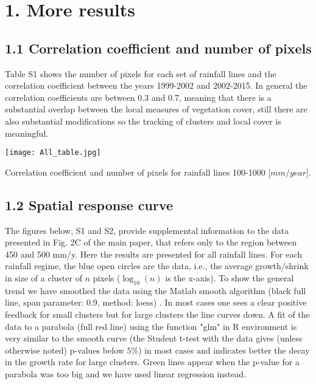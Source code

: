 \documentclass[aps,pre,twocolumn]{revtex4-1}
\begin{document}
\section*{1. More results}
\subsection*{1.1 Correlation coefficient and number of pixels} Table S1 shows the number of pixels for each set of rainfall lines and the correlation coefficient between the years 1999-2002 and 2002-2015. In general the correlation coefficients are between 0.3 and 0.7, meaning that there is a substantial overlap between the local measures of vegetation cover, still there are also substantial modifications so the tracking of clusters and local cover is meaningful.

\begin{table}[H]
    \texttt{[image: All\_table.jpg]}
    \caption{Correlation coefficient and number of pixels for rainfall lines 100-1000 [$mm/year$].}
\end{table}





\subsection*{1.2 Spatial response curve}
 The figures below, S1 and S2, provide supplemental information to the data presented in Fig. 2C of the main paper, that refers only to the region between 450 and 500 mm/y. Here the results are  presented for all rainfall lines. For each rainfall regime, the blue open circles are the data, i.e., the average growth/shrink in size of a cluster of $n$ pixels ($\log_{10}(n)$ is the x-axis).  To show the general trend we have smoothed the data using the Matlab smooth algorithm (black full line, span parameter: 0.9, method: loess) . In most cases one sees a clear positive feedback for small clusters but for large clusters the line curves down. A fit of the data to a parabola (full red line) using the function "glm" in R environment  is very similar to the smooth curve (the Student t-test with the data gives (unless otherwise noted) p-values below $5 \%$)  in most cases and indicates better the decay in the growth rate for large clusters. Green lines appear when the p-value for a parabola was too big and we have used linear regression instead.
\end{document}
